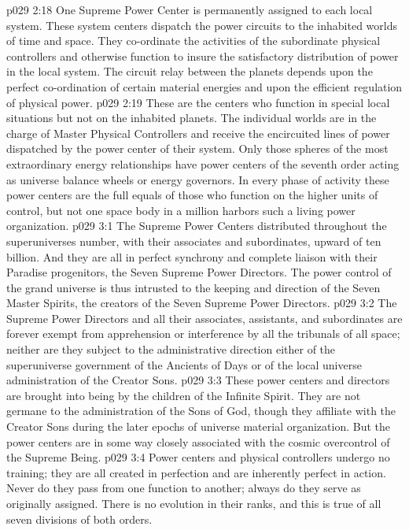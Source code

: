 \pc \vs p029 2:18 \bibnobreakspace {} One Supreme Power Center is permanently assigned to each local system. These system centers dispatch the power circuits to the inhabited worlds of time and space. They co\hyp{}ordinate the activities of the subordinate physical controllers and otherwise function to insure the satisfactory distribution of power in the local system. The circuit relay between the planets depends upon the perfect co\hyp{}ordination of certain material energies and upon the efficient regulation of physical power.\plusone
\pc \vs p029 2:19 \bibnobreakspace {} These are the centers who function in special local situations but not on the inhabited planets. The individual worlds are in the charge of Master Physical Controllers and receive the encircuited lines of power dispatched by the power center of their system. Only those spheres of the most extraordinary energy relationships have power centers of the seventh order acting as universe balance wheels or energy governors. In every phase of activity these power centers are the full equals of those who function on the higher units of control, but not one space body in a million harbors such a living power organization.
\vs p029 3:1 The Supreme Power Centers distributed throughout the superuniverses number, with their associates and subordinates, upward of ten billion. And they are all in perfect synchrony and complete liaison with their Paradise progenitors, the Seven Supreme Power Directors. The power control of the grand universe is thus intrusted to the keeping and direction of the Seven Master Spirits, the creators of the Seven Supreme Power Directors.
\vs p029 3:2 The Supreme Power Directors and all their associates, assistants, and subordinates are forever exempt from apprehension or interference by all the tribunals of all space; neither are they subject to the administrative direction either of the superuniverse government of the Ancients of Days or of the local universe administration of the Creator Sons.
\vs p029 3:3 These power centers and directors are brought into being by the children of the Infinite Spirit. They are not germane to the administration of the Sons of God, though they affiliate with the Creator Sons during the later epochs of universe material organization. But the power centers are in some way closely associated with the cosmic overcontrol of the Supreme Being.
\pc \vs p029 3:4 Power centers and physical controllers undergo no training; they are all created in perfection and are inherently perfect in action. Never do they pass from one function to another; always do they serve as originally assigned. There is no evolution in their ranks, and this is true of all seven divisions of both orders.

